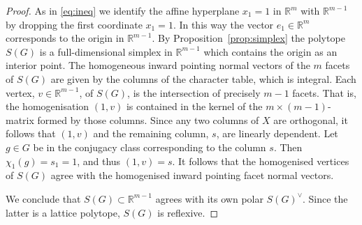\documentclass[12pt,leqno,a4paper]{amsart}
\newcommand{\RR}{{\mathbb{R}}}
\theoremstyle{definition}
\begin{document}
\begin{proof}
  As in \eqref{eq:ineq} we identify the affine hyperplane $x_1=1$ in $\RR^m$ with $\RR^{m-1}$ by dropping the first coordinate $x_1=1$.
  In this way the vector $e_1\in\RR^m$ corresponds to the origin in $\RR^{m-1}$.
  By Proposition~\ref{prop:simplex} the polytope $S(G)$ is a full-dimensional simplex in $\RR^{m-1}$ which contains the origin as an interior point.
  The homogeneous inward pointing normal vectors of the $m$ facets of $S(G)$ are given by the columns of the character table, which is integral.
  Each vertex, $v\in\RR^{m-1}$, of $S(G)$, is the intersection of precisely $m-1$ facets.
  That is, the homogenisation $(1,v)$ is contained in the kernel of the $m\times(m{-}1)$-matrix formed by those columns.
  Since any two columns of $X$ are orthogonal, it follows that $(1,v)$ and the remaining column, $s$, are linearly dependent.
  Let $g\in G$ be in the conjugacy class corresponding to the column $s$.
  Then $\chi_1(g)=s_1=1$, and thus $(1,v)=s$.
  It follows that the homogenised vertices of $S(G)$ agree with the homogenised inward pointing facet normal vectors.

  We conclude that $S(G)\subset\RR^{m-1}$ agrees with its own polar $S(G)^\vee$.
  Since the latter is a lattice polytope, $S(G)$ is reflexive.
\end{proof}
\end{document}
